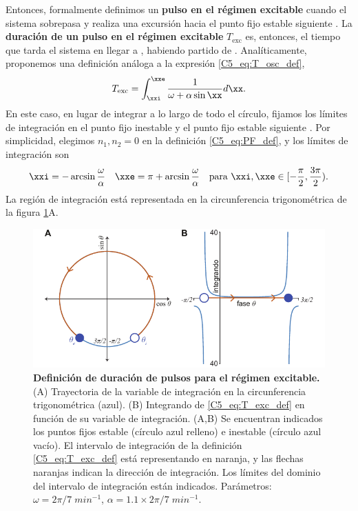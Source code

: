 {Entonces, formalmente definimos un \textbf{pulso en el régimen excitable} cuando el sistema sobrepasa \xxi y realiza una excursión hacia el punto fijo estable siguiente \xxe. La \textbf{duración de un pulso en el régimen excitable} $T_{\text{exc}}$ es, entonces, el tiempo que tarda el sistema en llegar a \xxe, habiendo partido de \xxi. Analíticamente, proponemos una definición análoga a la expresión \ref{C5_eq:T_osc_def}, 
\begin{align}
    T_{\text{exc}} = \int_{\xxi}^{\xxe}  \frac{1}{\omega + \alpha \sin{\xx}} d\xx. \label{C5_eq:T_exc_def}
\end{align}
En este caso, en lugar de integrar a lo largo de todo el círculo, fijamos los límites de integración en el punto fijo inestable \xxi y el punto fijo estable siguiente \xxe. Por simplicidad, elegimos $n_1,n_2 = 0$ en la definición \ref{C5_eq:PF_def}, y los límites de integración son
\begin{equation}
    \xxi = -\arcsin{\frac{\omega}{\alpha}} \quad \xxe = \pi + \arcsin{\frac{\omega}{\alpha}} \quad \text{para } \xxi,\xxe \in [-\frac{\pi}{2},\frac{3\pi}{2}).
\end{equation}
La región de integración está representada en la circunferencia trigonométrica de la figura \ref{C5_fig:T_exc_def}A. 


 \begin{figure}
    \centering
    \includegraphics[width=1\columnwidth]{figures/chapter5/C5_T_exc_def.pdf} 
    \caption{\textbf{Definición de duración de pulsos para el régimen excitable.} (A) Trayectoria de la variable de integración en la circunferencia trigonométrica (azul). (B) Integrando de \ref{C5_eq:T_exc_def} en función de su variable de integración. (A,B) Se encuentran indicados los puntos fijos estable \xxe (círculo azul relleno) e inestable \xxi (círculo azul vacío). El intervalo de integración de la definición \ref{C5_eq:T_exc_def} está representando en naranja, y  las flechas naranjas indican la dirección de integración. Los límites del dominio del intervalo de integración están indicados. Parámetros: $\omega=2\pi/7\;min^{-1}$, $\alpha = 1.1 \times 2\pi/7\;min^{-1}$.}
    \label{C5_fig:T_exc_def}
\end{figure}


}
